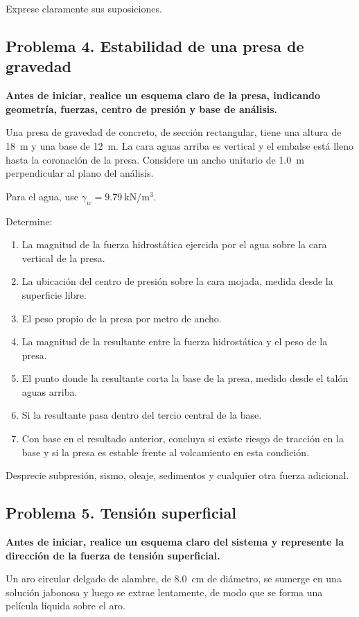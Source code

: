 \documentclass[11pt]{article}
\begin{document}
Exprese claramente sus suposiciones.

\subsection*{Problema 4. Estabilidad de una presa de gravedad}
\textbf{Antes de iniciar, realice un esquema claro de la presa, indicando geometría, fuerzas, centro de presión y base de análisis.}

Una presa de gravedad de concreto, de sección rectangular, tiene una altura de \SI{18}{\meter} y una base de \SI{12}{\meter}. La cara aguas arriba es vertical y el embalse está lleno hasta la coronación de la presa. Considere un ancho unitario de \SI{1.0}{\meter} perpendicular al plano del análisis.

Para el agua, use $\gamma_w = \SI{9.79}{\kilo\newton\per\meter\cubed}$.

Determine:
\begin{enumerate}
\item La magnitud de la fuerza hidrostática ejercida por el agua sobre la cara vertical de la presa.
\item La ubicación del centro de presión sobre la cara mojada, medida desde la superficie libre.
\item El peso propio de la presa por metro de ancho.
\item La magnitud de la resultante entre la fuerza hidrostática y el peso de la presa.
\item El punto donde la resultante corta la base de la presa, medido desde el talón aguas arriba.
\item Si la resultante pasa dentro del tercio central de la base.
\item Con base en el resultado anterior, concluya si existe riesgo de tracción en la base y si la presa es estable frente al volcamiento en esta condición.
\end{enumerate}

Desprecie subpresión, sismo, oleaje, sedimentos y cualquier otra fuerza adicional.

\subsection*{Problema 5. Tensión superficial}
\textbf{Antes de iniciar, realice un esquema claro del sistema y represente la dirección de la fuerza de tensión superficial.}

Un aro circular delgado de alambre, de \SI{8.0}{\centi\meter} de diámetro, se sumerge en una solución jabonosa y luego se extrae lentamente, de modo que se forma una película líquida sobre el aro.
\end{document}
